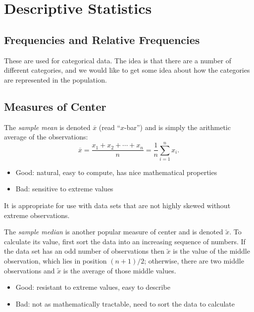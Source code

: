 \documentclass[captions=tableheading]{scrbook}
\begin{document}
\section{Descriptive Statistics}
\label{sec-3-3}
\label{sec-Descriptive-Statistics}
\subsection{Frequencies and Relative Frequencies}
\label{sec-3-3-1}
\label{sub-Frequencies-and-Relative}


These are used for categorical data. The idea is that there are a number of different categories, and we would like to get some idea about how the categories are represented in the population. 
\subsection{Measures of Center}
\label{sec-3-3-2}
\label{sub-Measures-of-Center}


The \emph{sample mean} is denoted \(\overline{x}\) (read ``\(x\)-bar'') and is simply the arithmetic average of the observations:
\begin{equation} 
\overline{x}=\frac{x_{1}+x_{2}+\cdots+x_{n}}{n}=\frac{1}{n}\sum_{i=1}^{n}x_{i}.
\end{equation}
\begin{itemize}
\item Good: natural, easy to compute, has nice mathematical properties
\item Bad: sensitive to extreme values
\end{itemize}

It is appropriate for use with data sets that are not highly skewed without extreme observations.

The \emph{sample median} is another popular measure of center and is denoted \(\tilde{x}\). To calculate its value, first sort the data into an increasing sequence of numbers. If the data set has an odd number of observations then \(\tilde{x}\) is the value of the middle observation, which lies in position \((n+1)/2\); otherwise, there are two middle observations and \(\tilde{x}\) is the average of those middle values.

\begin{itemize}
\item Good: resistant to extreme values, easy to describe
\item Bad: not as mathematically tractable, need to sort the data to calculate
\end{itemize}
\end{document}
